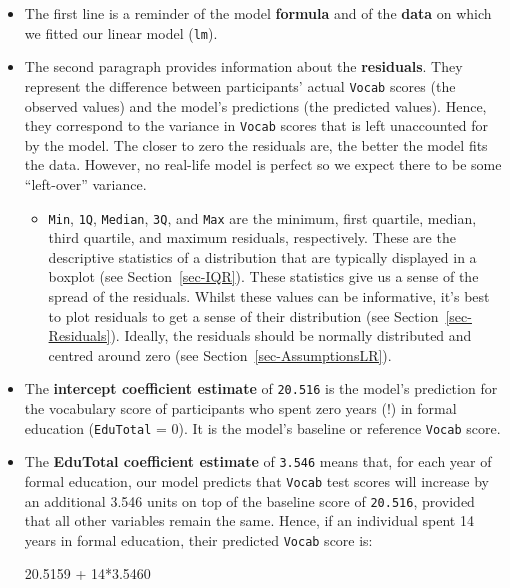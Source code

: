 \documentclass[
  letterpaper,
  DIV=11,
  numbers=noendperiod]{scrreprt}
\newenvironment{Shaded}{\begin{snugshade}}{\end{snugshade}}
\newcommand{\DecValTok}[1]{\textcolor[rgb]{0.68,0.00,0.00}{#1}}
\newcommand{\FloatTok}[1]{\textcolor[rgb]{0.68,0.00,0.00}{#1}}
\newcommand{\SpecialCharTok}[1]{\textcolor[rgb]{0.37,0.37,0.37}{#1}}
\providecommand{\tightlist}{%
  \setlength{\itemsep}{0pt}\setlength{\parskip}{0pt}}
\begin{document}
\begin{itemize}
\item
  The first line is a reminder of the model \textbf{formula} and of the
  \textbf{data} on which we fitted our linear model (\texttt{lm}).
\item
  The second paragraph provides information about the
  \textbf{residuals}. They represent the difference between
  participants' actual \texttt{Vocab} scores (the observed values) and
  the model's predictions (the predicted values). Hence, they correspond
  to the variance in \texttt{Vocab} scores that is left unaccounted for
  by the model. The closer to zero the residuals are, the better the
  model fits the data. However, no real-life model is perfect so we
  expect there to be some ``left-over'' variance.

  \begin{itemize}
  \tightlist
  \item
    \texttt{Min}, \texttt{1Q}, \texttt{Median}, \texttt{3Q}, and
    \texttt{Max} are the minimum, first quartile, median, third
    quartile, and maximum residuals, respectively. These are the
    descriptive statistics of a distribution that are typically
    displayed in a boxplot (see Section~\ref{sec-IQR}). These statistics
    give us a sense of the spread of the residuals. Whilst these values
    can be informative, it's best to plot residuals to get a sense of
    their distribution (see Section~\ref{sec-Residuals}). Ideally, the
    residuals should be normally distributed and centred around zero
    (see Section~\ref{sec-AssumptionsLR}).
  \end{itemize}
\item
  The \textbf{intercept coefficient estimate} of \texttt{20.516} is the
  model's prediction for the vocabulary score of participants who spent
  zero years (!) in formal education (\texttt{EduTotal} = 0). It is the
  model's baseline or reference \texttt{Vocab} score.
\item
  The \textbf{EduTotal coefficient estimate} of \texttt{3.546} means
  that, for each year of formal education, our model predicts that
  \texttt{Vocab} test scores will increase by an additional 3.546 units
  on top of the baseline score of \texttt{20.516}, provided that all
  other variables remain the same. Hence, if an individual spent 14
  years in formal education, their predicted \texttt{Vocab} score is:

\begin{Shaded}
\begin{Highlighting}[]
\FloatTok{20.5159} \SpecialCharTok{+} \DecValTok{14}\SpecialCharTok{*}\FloatTok{3.5460}
\end{Highlighting}
\end{Shaded}


\end{itemize}
\end{document}
